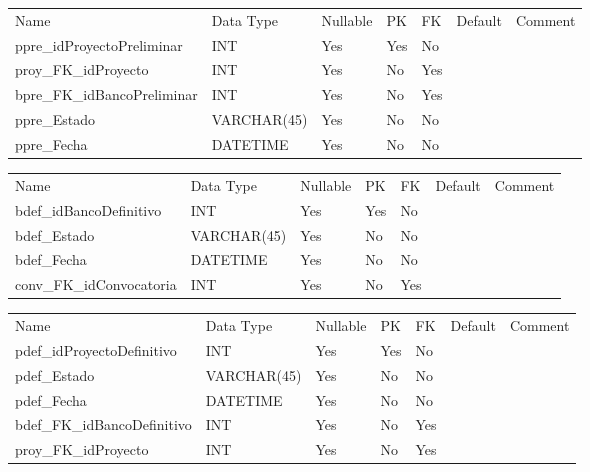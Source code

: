 			\begin{center}
				\begin{tabular}{ |l|l|l|l|l|l|l| }
					\hline
					Name & Data Type & Nullable & PK & FK & Default & Comment \\
					ppre_idProyectoPreliminar & INT & Yes & Yes & No &  & \\ \hline 
proy_FK_idProyecto & INT & Yes & No & Yes &  & \\ \hline 
bpre_FK_idBancoPreliminar & INT & Yes & No & Yes &  & \\ \hline 
ppre_Estado & VARCHAR(45) & Yes & No & No &  & \\ \hline 
ppre_Fecha & DATETIME & Yes & No & No &  & \\ \hline 

				\end{tabular}
			\end{center}
		

			\begin{center}
				\begin{tabular}{ |l|l|l|l|l|l|l| }
					\hline
					Name & Data Type & Nullable & PK & FK & Default & Comment \\
					bdef_idBancoDefinitivo & INT & Yes & Yes & No &  & \\ \hline 
bdef_Estado & VARCHAR(45) & Yes & No & No &  & \\ \hline 
bdef_Fecha & DATETIME & Yes & No & No &  & \\ \hline 
conv_FK_idConvocatoria & INT & Yes & No & Yes &  & \\ \hline 

				\end{tabular}
			\end{center}
		

			\begin{center}
				\begin{tabular}{ |l|l|l|l|l|l|l| }
					\hline
					Name & Data Type & Nullable & PK & FK & Default & Comment \\
					pdef_idProyectoDefinitivo & INT & Yes & Yes & No &  & \\ \hline 
pdef_Estado & VARCHAR(45) & Yes & No & No &  & \\ \hline 
pdef_Fecha & DATETIME & Yes & No & No &  & \\ \hline 
bdef_FK_idBancoDefinitivo & INT & Yes & No & Yes &  & \\ \hline 
proy_FK_idProyecto & INT & Yes & No & Yes &  & \\ \hline 

				\end{tabular}
			\end{center}
		

